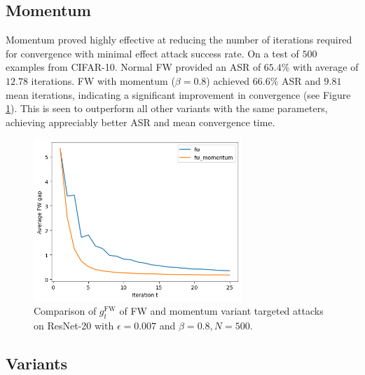 \documentclass{article}
\begin{document}
\subsection{Momentum}

Momentum proved highly effective at reducing the number of iterations required for convergence with minimal effect attack success rate. On a test of $500$ examples from CIFAR-10. Normal FW provided an ASR of $65.4\%$ with average of $12.78$ iterations. FW with momentum ($\beta = 0.8$) achieved $66.6\%$ ASR and $9.81$ mean iterations, indicating a significant improvement in convergence (see Figure \ref{fig:momentum}). This is seen to outperform all other variants with the same parameters, achieving appreciably better ASR and mean convergence time.

\begin{figure}[H]
    \centering
    \includegraphics[width=0.7\textwidth]{plots/momentum.png}
    \caption{Comparison of $g_t^\text{FW}$ of FW and momentum variant targeted attacks on ResNet-20 with $\epsilon = 0.007$ and $\beta = 0.8, N = 500$.}
    \label{fig:momentum}
\end{figure}

\subsection{Variants}
\end{document}
